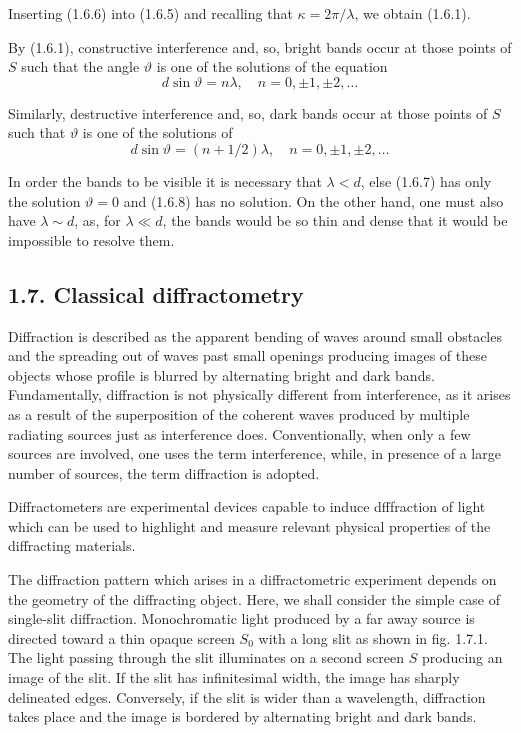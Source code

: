 \documentclass{article}
\begin{document}
Inserting (1.6.6) into (1.6.5) and recalling that $\kappa=2 \pi / \lambda$, we obtain (1.6.1).

By (1.6.1), constructive interference and, so, bright bands occur at those points of $S$ such that the angle $\vartheta$ is one of the solutions of the equation
$$
\begin{equation*}
d \sin \vartheta=n \lambda, \quad n=0, \pm 1, \pm 2, \ldots \tag{1.6.7}
\end{equation*}
$$

Similarly, destructive interference and, so, dark bands occur at those points of $S$
such that $\vartheta$ is one of the solutions of
$$
\begin{equation*}
d \sin \vartheta=(n+1 / 2) \lambda, \quad n=0, \pm 1, \pm 2, \ldots \tag{1.6.8}
\end{equation*}
$$

In order the bands to be visible it is necessary that $\lambda<d$, else (1.6.7) has only the solution $\vartheta=0$ and (1.6.8) has no solution. On the other hand, one must also have $\lambda \sim d$, as, for $\lambda \ll d$, the bands would be so thin and dense that it would be impossible to resolve them.

\subsection*{1.7. Classical diffractometry}

Diffraction is described as the apparent bending of waves around small obstacles and the spreading out of waves past small openings producing images of these objects whose profile is blurred by alternating bright and dark bands. Fundamentally, diffraction is not physically different from interference, as it arises as a result of the superposition of the coherent waves produced by multiple radiating sources just as interference does. Conventionally, when only a few sources are involved, one uses the term interference, while, in presence of a large number of sources, the term diffraction is adopted.

Diffractometers are experimental devices capable to induce dfffraction of light which can be used to highlight and measure relevant physical properties of the diffracting materials.

The diffraction pattern which arises in a diffractometric experiment depends on the geometry of the diffracting object. Here, we shall consider the simple case of single-slit diffraction. Monochromatic light produced by a far away source is directed toward a thin opaque screen $S_{0}$ with a long slit as shown in fig. 1.7.1. The light passing through the slit illuminates on a second screen $S$ producing an image of the slit. If the slit has infinitesimal width, the image has sharply delineated edges. Conversely, if the slit is wider than a wavelength, diffraction takes place and the image is bordered by alternating bright and dark bands.
\end{document}
